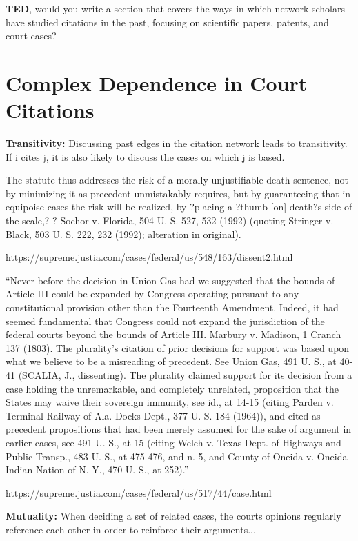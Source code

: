 \documentclass[headsepline=true, abstracton]{scrartcl}
\begin{document}
\textbf{TED}, would you write a section that covers the ways in which network scholars have studied citations in the past, focusing on scientific papers, patents, and court cases? 


\section{Complex Dependence in Court Citations}

\textbf{Transitivity:} Discussing past edges in the citation network leads to transitivity. If i cites j, it is also likely to discuss the cases on which j is based.

The statute thus addresses the risk of a morally unjustifiable death sentence, not by minimizing it as precedent unmistakably requires, but by guaranteeing that in equipoise cases the risk will be realized, by ?placing a ?thumb [on] death?s side of the scale,? ? Sochor v. Florida, 504 U. S. 527, 532 (1992) (quoting Stringer v. Black, 503 U. S. 222, 232 (1992); alteration in original).

https://supreme.justia.com/cases/federal/us/548/163/dissent2.html


``Never before the decision in Union Gas had we suggested that the bounds of Article III could be expanded by Congress operating pursuant to any constitutional provision other than the Fourteenth Amendment. Indeed, it had seemed fundamental that Congress could not expand the jurisdiction of the federal courts beyond the bounds of Article III. Marbury v. Madison, 1 Cranch 137 (1803). The plurality's citation of prior decisions for support was based upon what we believe to be a misreading of precedent. See Union Gas, 491 U. S., at 40-41 (SCALIA, J., dissenting). The plurality claimed support for its decision from a case holding the unremarkable, and completely unrelated, proposition that the States may waive their sovereign immunity, see id., at 14-15 (citing Parden v. Terminal Railway of Ala. Docks Dept., 377 U. S. 184 (1964)), and cited as precedent propositions that had been merely assumed for the sake of argument in earlier cases, see 491 U. S., at 15 (citing Welch v. Texas Dept. of Highways and Public Transp., 483 U. S., at 475-476, and n. 5, and County of Oneida v. Oneida Indian Nation of N. Y., 470 U. S., at 252).''

https://supreme.justia.com/cases/federal/us/517/44/case.html


\textbf{Mutuality:} When deciding a set of related cases, the courts opinions regularly reference each other in order to reinforce their arguments...
\end{document}
